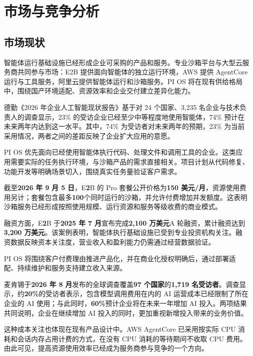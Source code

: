 \chapter{市场与竞争分析}
\section{市场现状}\label{sec:4.1}
智能体运行基础设施已经形成企业可采购的产品和服务。专业沙箱平台与大型云服务商共同参与市场：E2B 提供面向智能体的独立运行环境，AWS 提供 AgentCore 运行与工具服务，阿里云提供智能体运行和沙箱服务。PI OS 将在现有供给格局中，围绕国产环境适配、资源效率和企业交付建立差异化能力。

德勤《2026 年企业人工智能现状报告》基于对 24 个国家、3,235 名企业与技术负责人的调查显示，23\% 的受访企业已经至少中等程度地使用智能体，74\% 预计在未来两年内达到这一水平。其中，74\% 为受访者对未来两年的预期，23\% 为当前采用情况，两者之间的差距反映了企业扩大应用的意愿。

PI OS 优先面向已经使用智能体执行代码、处理文件和调用工具的企业。这类应用需要实际的任务执行环境，与沙箱产品的需求直接相关。项目计划从代码修复、功能开发等明确场景切入，围绕真实任务量验证客户需求。

截至\textbf{2026 年 9 月 5 日}，E\textbf{2}B 的 Pro 套餐公开价格为\textbf{150 美元/\allowbreak{}月}，资源使用费用另计；套餐包含最多\textbf{100}个同时运行的沙箱，并允许付费增加并发额度。这表明沙箱服务已经形成按照使用规模、运行资源和服务等级收费的商业模式。

融资方面，E\textbf{2}B 于\textbf{2025 年 7 月}宣布完成\textbf{2,100 万美元}A 轮融资，累计融资达到\textbf{3,200 万美元}。该案例表明，智能体执行基础设施已受到专业投资机构关注。融资数据反映资本关注度，营业收入和盈利能力仍需通过经营数据验证。

PI OS 将围绕客户付费理由推进产品化，并在商业化授权明确后，通过部署适配、持续维护和服务支持建立收入来源。

麦肯锡于\textbf{2026 年 8 月}发布的全球调查覆盖\textbf{97 个国家}的\textbf{1,719 名受访者}。调查显示，约\textbf{20\%}的受访者表示，包含模型调用费用在内的 AI 运营成本已经限制了所在企业的 AI 使用；与此同时，\textbf{60\%}预计企业将在未来一年增加 AI 投入。两项结果共同说明，企业在继续增加 AI 投入的同时，更加重视新增投入带来的业务价值。

这种成本关注也体现在现有产品设计中。AWS AgentCore 已采用按实际 CPU 消耗和会话内存占用计费的方式，在没有 CPU 消耗的等待期间不收取 CPU 费用。由此可见，提高资源使用效率已经成为服务商参与竞争的一个方向。

